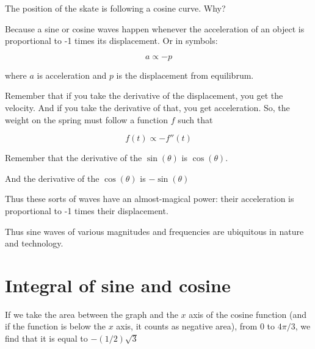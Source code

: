 The position of the skate is following a cosine curve. Why?

Because a sine or cosine waves happen whenever the acceleration of 
an object is proportional to -1 times its displacement. Or in symbols:

$$a \propto - p$$

where $a$ is acceleration and $p$ is the displacement from equilibrum.

Remember that if you take the derivative of the displacement, you get
the velocity. And if you take the derivative of that, you get
acceleration. So, the weight on the spring must follow a function $f$ such that

$$f(t) \propto - f''(t)$$

Remember that the derivative of the $\sin(\theta)$ is $\cos(\theta)$.

And the derivative of the $\cos(\theta)$ is $- \sin(\theta)$

Thus these sorts of waves have an almost-magical power: their
acceleration is proportional to -1 times their displacement.

Thus sine waves of various magnitudes and frequencies are ubiquitous
in nature and technology.

\section{Integral of sine and cosine}

If we take the area between the graph and the $x$ axis of the cosine
function (and if the function is below the $x$ axis, it counts as
negative area), from 0 to $4\pi/3$, we find that it is equal to
$-(1/2)\sqrt{3}$

